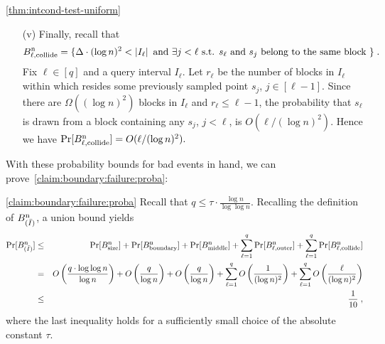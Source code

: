 \begin{proofof}{\cref{thm:intcond-test-uniform}}
\begin{itemize}
\item [(v)]
Finally, recall that
\[
B^{\rm n}_{\ell,\rm collide} =
\{ \Delta \cdot (\log n)^2 < \left\lvert I_\ell \right\rvert \mbox{ and }
\exists j < \ell \mbox{ s.t. } s_\ell \mbox{ and } s_j \mbox{ belong to the same block } \}\;.
\]
Fix $\ell \in [q]$ and a query interval $I_\ell$. Let $r_\ell$ be the number of blocks in $I_\ell$ within which resides
some previously sampled point $s_j$, $j \in [\ell-1]$.
Since there are
$\Omega((\log n)^2)$ blocks in $I_\ell$ and $r_\ell \leq \ell-1$,
the probability that $s_\ell$ is drawn from
a block containing any $s_j$, $j < \ell$, is $O(\ell/(\log n)^2).$
Hence we have
$\Pr[B^{\rm n}_{\ell,\rm collide}] =  O(\ell/(\log n)^2).$

\end{itemize}

\noindent With these probability bounds for bad events in hand, we can prove~\cref{claim:boundary:failure:proba}:

\begin{proofof}{\cref{claim:boundary:failure:proba}}
Recall that $q \leq \tau \cdot \frac{\log n}{\log\log n}$.
Recalling the definition of $B^{\rm n}_{(\bar{I})}$,
a union bound yields
\begin{eqnarray*}
\Pr[ B^{\rm n}_{(\bar{I})} ]
    &\leq& \Pr[ B^{\rm n}_{\rm size} ] + \Pr[  B^{\rm n}_{\rm boundary} ] + \Pr[  B^{\rm n}_{\rm middle} ] + \sum_{\ell=1}^q \Pr[ B^{\rm n}_{\ell,\rm outer} ] + \sum_{\ell=1}^q \Pr[ B^{\rm n}_{\ell,\rm collide} ] \\
&=& O\left( {\frac {q \cdot \log \log n}{\log n}} \right)
+ O\left( {\frac q {\log n}} \right)
+ O\left( {\frac q {\log n}} \right)
+ \sum_{\ell=1}^q O\left({\frac{1}{(\log n)^2}} \right)
+ \sum_{\ell=1}^q O\left({\frac {\ell} {(\log n)^2}} \right)\\
&\leq& {\frac{1}{10}}\;,
\end{eqnarray*}
where the last inequality holds for a sufficiently small choice of the
absolute constant $\tau.$


\end{proofof}
\end{proofof}
